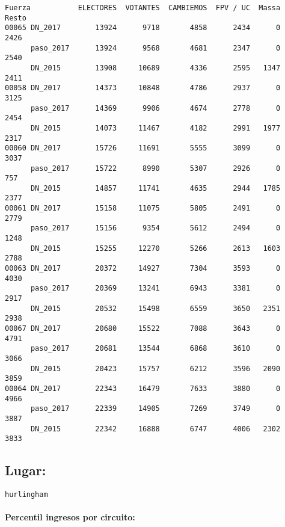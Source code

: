 \documentclass[11pt]{article}
\begin{document}
    \begin{verbatim}
Fuerza           ELECTORES  VOTANTES  CAMBIEMOS  FPV / UC  Massa  Resto
00065 DN_2017        13924      9718       4858      2434      0   2426
      paso_2017      13924      9568       4681      2347      0   2540
      DN_2015        13908     10689       4336      2595   1347   2411
00058 DN_2017        14373     10848       4786      2937      0   3125
      paso_2017      14369      9906       4674      2778      0   2454
      DN_2015        14073     11467       4182      2991   1977   2317
00060 DN_2017        15726     11691       5555      3099      0   3037
      paso_2017      15722      8990       5307      2926      0    757
      DN_2015        14857     11741       4635      2944   1785   2377
00061 DN_2017        15158     11075       5805      2491      0   2779
      paso_2017      15156      9354       5612      2494      0   1248
      DN_2015        15255     12270       5266      2613   1603   2788
00063 DN_2017        20372     14927       7304      3593      0   4030
      paso_2017      20369     13241       6943      3381      0   2917
      DN_2015        20532     15498       6559      3650   2351   2938
00067 DN_2017        20680     15522       7088      3643      0   4791
      paso_2017      20681     13544       6868      3610      0   3066
      DN_2015        20423     15757       6212      3596   2090   3859
00064 DN_2017        22343     16479       7633      3880      0   4966
      paso_2017      22339     14905       7269      3749      0   3887
      DN_2015        22342     16888       6747      4006   2302   3833
    \end{verbatim}

    
    \hypertarget{lugar}{%
\subsection{Lugar:}\label{lugar}}

    
    \begin{Verbatim}[commandchars=\\\{\}]
hurlingham

    \end{Verbatim}

    \hypertarget{percentil-ingresos-por-circuito}{%
\paragraph{Percentil ingresos por
circuito:}\label{percentil-ingresos-por-circuito}}
\end{document}

